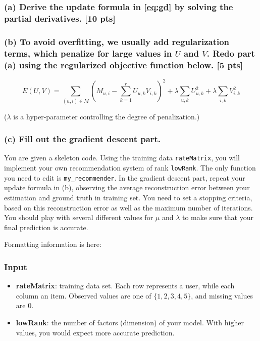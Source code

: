 \documentclass[twoside,10pt]{article}
\begin{document}
\subsubsection*{(a) Derive the update formula in \eqref{eq:gd} by
solving the partial derivatives. [10 pts]}

\subsubsection*{(b) To avoid overfitting, we usually add regularization terms, which penalize for large values in $U$ and $V$.
Redo part (a) using the regularized objective function below. [5
pts]}

\begin{equation}
E(U,V) = \sum_{(u, i) \in M} (M_{u,i} - \sum_{k=1}^r U_{u,k}
V_{i,k})^2 + \lambda \sum_{u,k} U_{u,k}^2 + \lambda \sum_{i,k}
V_{i,k}^2 \nonumber
\end{equation}

($\lambda$ is a hyper-parameter controlling the degree of
penalization.)

\subsubsection*{(c) Fill out the gradient descent part.}

You are given a skeleton code. Using the
training data \texttt{rateMatrix}, you will implement your own
recommendation system of rank \texttt{lowRank}. The only function you
need to edit is \texttt{my\_recommender}. In the gradient descent
part, repeat your update formula in (b), observing the average
reconstruction error between your estimation and ground truth in
training set. You need to set a stopping criteria, based on this
reconstruction error as well as the maximum number of iterations.
You should play with several different values for $\mu$ and
$\lambda$ to make sure that your final prediction is accurate.

Formatting information is here:

\subsubsection*{Input}
\begin{itemize}
  \item \textbf{rateMatrix}: training data set. Each row represents a user, while each column an item.
  Observed values are one of $\{1,2,3,4,5\}$, and missing values are
  0.
  \item \textbf{lowRank}: the number of factors (dimension) of your
  model. With higher values, you would expect more accurate
  prediction.
\end{itemize}
\end{document}
